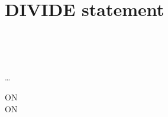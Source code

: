 \section{DIVIDE statement}

\begin{syntax}
  \begin{1=}
    \identifier \\
    \literal
  \end{1=}
  \begin{1=}
    \begin{1=}
      \identifier \\
      \literal
    \end{1=}
    \begin{0-1}
    \end{0-1}
  \end{1=} \ldots

  \begin{0+}
    ON   \imperativestatement \\
     ON   \imperativestatement
  \end{0+}

  \begin{0-1}
  \end{0-1}
\end{syntax}

